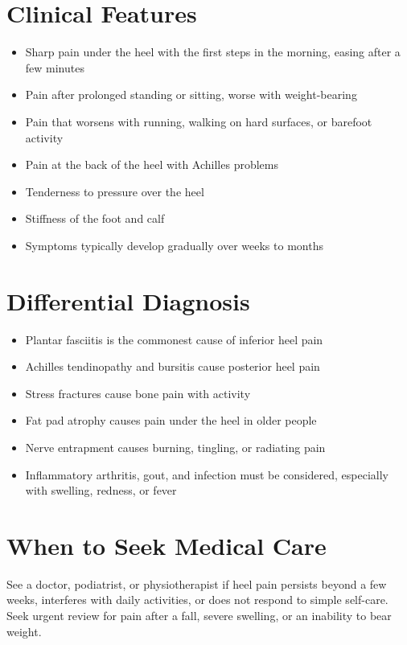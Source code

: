\section*{Clinical Features}
\begin{itemize}
    \item Sharp pain under the heel with the first steps in the morning, easing after a few minutes
    \item Pain after prolonged standing or sitting, worse with weight-bearing
    \item Pain that worsens with running, walking on hard surfaces, or barefoot activity
    \item Pain at the back of the heel with Achilles problems
    \item Tenderness to pressure over the heel
    \item Stiffness of the foot and calf
    \item Symptoms typically develop gradually over weeks to months
\end{itemize}

\section*{Differential Diagnosis}
\begin{itemize}
    \item Plantar fasciitis is the commonest cause of inferior heel pain
    \item Achilles tendinopathy and bursitis cause posterior heel pain
    \item Stress fractures cause bone pain with activity
    \item Fat pad atrophy causes pain under the heel in older people
    \item Nerve entrapment causes burning, tingling, or radiating pain
    \item Inflammatory arthritis, gout, and infection must be considered, especially with swelling, redness, or fever
\end{itemize}

\section*{When to Seek Medical Care}
See a doctor, podiatrist, or physiotherapist if heel pain persists beyond a few weeks, interferes with daily activities, or does not respond to simple self-care. Seek urgent review for pain after a fall, severe swelling, or an inability to bear weight.

